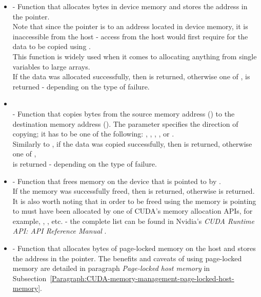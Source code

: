 \begin{itemize}
	\item {} - Function that allocates  bytes in device memory and stores the address in the  pointer. \\
	Note that since the pointer is to an address located in device memory, it is inaccessible from the host - access from the host would first require for the data to be copied using . \\
	This function is widely used when it comes to allocating anything from single variables to large arrays. \\
	If the data was allocated successfully, then  is returned, otherwise one of ,  is returned - depending on the type of failure.
	\item {}\\  - Function that copies  bytes from the source memory address () to the destination memory address (). The  parameter specifies the direction of copying; it has to be one of the following: , , , , or . \\
	Similarly to , if the data was copied successfully, then  is returned, otherwise one of , \\  is returned - depending on the type of failure.
	\item {} - Function that frees memory on the device that is pointed to by . \\
	If the memory was successfully freed, then  is returned, otherwise  is returned. \\
	It is also worth noting that in order to be freed using  the memory  is pointing to must have been allocated by one of CUDA's memory allocation APIs, for example, , , etc. - the complete list can be found in Nvidia's \emph{CUDA Runtime API: API Reference Manual} \cite{NvidiaJanuary2022}.
	\item {} - Function that allocates  bytes of page-locked memory on the host and stores the address in the  pointer. The benefits and caveats of using page-locked memory are detailed in paragraph \textit{Page-locked host memory} in Subsection~\ref{Paragraph:CUDA-memory-management-page-locked-host-memory}.
\end{itemize}


